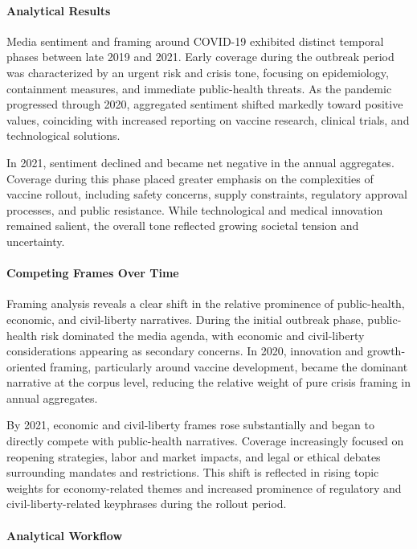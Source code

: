 \paragraph{Analytical Results}

Media sentiment and framing around COVID-19 exhibited distinct temporal phases between late 2019 and 2021. Early coverage during the outbreak period was characterized by an urgent risk and crisis tone, focusing on epidemiology, containment measures, and immediate public-health threats. As the pandemic progressed through 2020, aggregated sentiment shifted markedly toward positive values, coinciding with increased reporting on vaccine research, clinical trials, and technological solutions.

In 2021, sentiment declined and became net negative in the annual aggregates. Coverage during this phase placed greater emphasis on the complexities of vaccine rollout, including safety concerns, supply constraints, regulatory approval processes, and public resistance. While technological and medical innovation remained salient, the overall tone reflected growing societal tension and uncertainty.

\paragraph{Competing Frames Over Time}

Framing analysis reveals a clear shift in the relative prominence of public-health, economic, and civil-liberty narratives. During the initial outbreak phase, public-health risk dominated the media agenda, with economic and civil-liberty considerations appearing as secondary concerns. In 2020, innovation and growth-oriented framing, particularly around vaccine development, became the dominant narrative at the corpus level, reducing the relative weight of pure crisis framing in annual aggregates.

By 2021, economic and civil-liberty frames rose substantially and began to directly compete with public-health narratives. Coverage increasingly focused on reopening strategies, labor and market impacts, and legal or ethical debates surrounding mandates and restrictions. This shift is reflected in rising topic weights for economy-related themes and increased prominence of regulatory and civil-liberty-related keyphrases during the rollout period.

\paragraph{Analytical Workflow}

